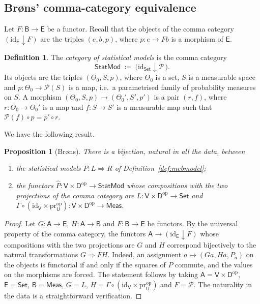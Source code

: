 \documentclass[11pt,a4paper]{article}
\theoremstyle{plain}
\newtheorem{proposition}[theorem]{Proposition}
\theoremstyle{definition}
\newtheorem{definition}[theorem]{Definition}
\theoremstyle{remark}
\newcommand{\cat}[1]{\mathsf{#1}}
\newcommand{\catU}{\cat{U}}
\newcommand{\catV}{\cat{V}}
\newcommand{\catD}{\cat{D}}
\newcommand{\Meas}{\cat{Meas}}
\newcommand{\Set}{\cat{Set}}
\newcommand{\Prb}{\mathcal{P}}
\newcommand{\op}{\mathrm{op}}
\newcommand{\id}{\mathrm{id}}
\newcommand{\pr}{\mathrm{pr}}
\newcommand{\StatMod}{\cat{StatMod}}
\begin{document}
\subsection{Br\o ns' comma-category equivalence}

Let $F \colon \cat{B} \to \cat{E}$ be a functor. Recall that the objects of the
comma category $(\id_{\cat E} \downarrow F)$ are the triples $(e, b, p)$, where
$p \colon e \to F b$ is a morphism of $\cat{E}$.

\begin{definition}\label{def:statmod}
The \emph{category of statistical models} is the comma category
\[
\StatMod \;\coloneqq\; \bigl(\id_{\Set} \downarrow \Prb\,\bigr).
\]
Its objects are the triples $(\Theta_0,S,p)$, where $\Theta_0$ is a set, $S$ is
a measurable space and $p \colon \Theta_0 \to \Prb(S)$ is a map, i.e.\ a
parametrised family of probability measures on $S$. A morphism
$(\Theta_0,S,p) \to (\Theta_0',S',p')$ is a pair $(r,f)$, where
$r \colon \Theta_0 \to \Theta_0'$ is a map and $f \colon S \to S'$ is a
measurable map such that $\Prb(f) \circ p = p' \circ r$.
\end{definition}

We have the following result.

\begin{proposition}[Br\o ns]\label{prop:brons}
There is a bijection, natural in all the data, between
\begin{enumerate}
\item the statistical models $P \colon L \Rightarrow R$ of
Definition~\ref{def:mcbmodel};
\item the functors $\widehat{P} \colon \catV \times \catD^{\op} \to \StatMod$
whose compositions with the two projections of the comma category are
$L \colon \catV \times \catD^{\op} \to \Set$ and
$\Gamma \circ (\id_{\catV} \times \pr_\catU^{\op}) \colon
\catV \times \catD^{\op} \to \Meas$.
\end{enumerate}
\end{proposition}

\begin{proof}
Let $G \colon \cat{A} \to \cat{E}$, $H \colon \cat{A} \to \cat{B}$ and
$F \colon \cat{B} \to \cat{E}$ be functors. By the universal property of the
comma category, the functors $\cat{A} \to (\id_{\cat E} \downarrow F)$ whose
compositions with the two projections are $G$ and $H$ correspond bijectively
to the natural transformations $G \Rightarrow F H$. Indeed, an assignment
$a \mapsto (G a, H a, P_a)$ on the objects is functorial if and only if the
squares of $P$ commute, and the values on the morphisms are forced. The
statement follows by taking $\cat{A} = \catV \times \catD^{\op}$,
$\cat{E} = \Set$, $\cat{B} = \Meas$, $G = L$,
$H = \Gamma \circ (\id_{\catV} \times \pr_\catU^{\op})$ and $F = \Prb$. The
naturality in the data is a straightforward verification.
\end{proof}
\end{document}
